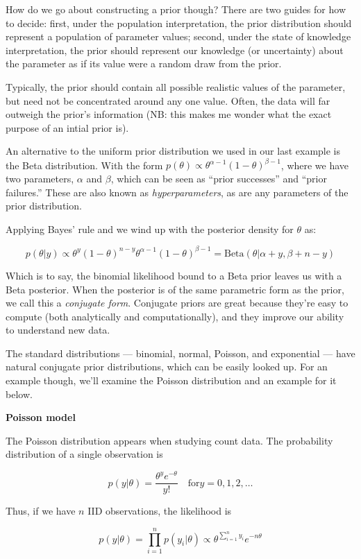 \documentclass[]{book}
\begin{document}
How do we go about constructing a prior though? There are two guides for
how to decide: first, under the population interpretation, the prior
distribution should represent a population of parameter values; second,
under the state of knowledge interpretation, the prior should represent
our knowledge (or uncertainty) about the parameter as if its value were
a random draw from the prior.

Typically, the prior should contain all possible realistic values of the
parameter, but need not be concentrated around any one value. Often, the
data will far outweigh the prior's information (NB: this makes me wonder
what the exact purpose of an intial prior is).

An alternative to the uniform prior distribution we used in our last
example is the Beta distribution. With the form
\(p(\theta)\propto \theta^{\alpha-1}(1-\theta)^{\beta-1}\), where we
have two parameters, \(\alpha\) and \(\beta\), which can be seen as
``prior successes'' and ``prior failures.'' These are also known as
\emph{hyperparameters}, as are any parameters of the prior distribution.

Applying Bayes' rule and we wind up with the posterior density for
\(\theta\) as:

\[
p(\theta|y) \propto \theta^y(1-\theta)^{n-y}\theta^{\alpha-1}(1-\theta)^{\beta-1} = \text{Beta}(\theta|\alpha+y, \beta+n-y)
\]

Which is to say, the binomial likelihood bound to a Beta prior leaves us
with a Beta posterior. When the posterior is of the same parametric form
as the prior, we call this a \emph{conjugate form}. Conjugate priors are
great because they're easy to compute (both analytically and
computationally), and they improve our ability to understand new data.

The standard distributions --- binomial, normal, Poisson, and
exponential --- have natural conjugate prior distributions, which can be
easily looked up. For an example though, we'll examine the Poisson
distribution and an example for it below.

\textbf{Poisson model}

The Poisson distribution appears when studying count data. The
probability distribution of a single observation is

\[
p(y|\theta) = \frac{\theta^ye^{-\theta}}{y!}\quad \text{for} y=0,1,2,\ldots
\]

Thus, if we have \(n\) IID observations, the likelihood is

\[
p(y|\theta) = \prod_{i=1}^n p(y_i|\theta) \propto \theta^{\sum_{i=1}^n y_i} e^{-n\theta}
\]
\end{document}
